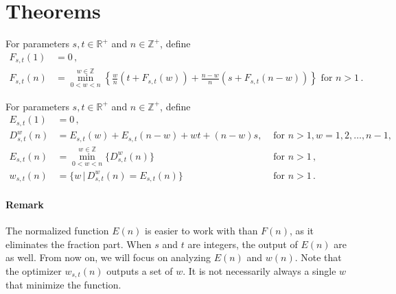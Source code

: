 \documentclass[]{article}
\begin{document}
\section{Theorems}

\vspace{1cm}
\begin{definition}
For parameters $s, t\in\mathbb{R}^+$ and $n \in\mathbb{Z}^+$, define
\begin{align*}
	F_{s,t}(1) &= 0\,,\\
	F_{s,t}(n) &= \min_{0<w<n}^{w\in\mathbb{Z}}\left\{\frac{w}{n}(t + F_{s,t}(w)) + \frac{n-w}{n}(s + F_{s,t}(n-w))\right\} \textrm{ for } n > 1 \,.
\end{align*}
\end{definition}

\vspace{1cm}
\begin{definition}
	For parameters $s, t\in\mathbb{R}^+$ and $n \in\mathbb{Z}^+$, define
	\begin{align*}
		E_{s,t}(1) &= 0\,,\\
		D^{w}_{s,t}(n) &= E_{s,t}(w) + E_{s,t}(n-w) + wt +(n-w)s,&\textrm{ for } n > 1, w=1,2,\dots,n-1, \\
		E_{s,t}(n) &= \min_{0<w<n}^{w\in\mathbb{Z}}\{D^{w}_{s,t}(n)\} &\textrm{ for } n > 1 \,,\\
		w_{s,t}(n) &= \{w \,|\, D^{w}_{s,t}(n) = E_{s,t}(n)\}\ &\textrm{ for } n > 1\,.
	\end{align*}
\end{definition}
\paragraph{Remark}
The normalized function $E(n)$ is easier to work with than $F(n)$, as it eliminates the fraction part. When $s$ and $t$ are integers, the output of $E(n)$ are as well. From now on, we will focus on analyzing $E(n)$ and $w(n)$. Note that the optimizer $w_{s,t}(n)$ outputs a set of $w$. It is not necessarily always a single $w$ that minimize the function.
\end{document}
